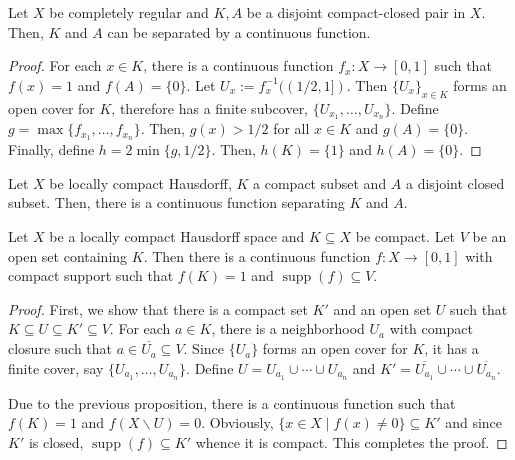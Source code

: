\begin{proposition}
    Let $X$ be completely regular and $K,A$ be a disjoint compact-closed pair in $X$. Then, $K$ and $A$ can be separated by a continuous function.
\end{proposition}
\begin{proof}
    For each $x\in K$, there is a continuous function $f_x: X\to[0,1]$ such that $f(x) = 1$ and $f(A) = \{0\}$. Let $U_x := f_x^{-1}((1/2,1])$. Then $\{U_x\}_{x\in K}$ forms an open cover for $K$, therefore has a finite subcover, $\{U_{x_1},\ldots,U_{x_n}\}$. Define $g = \max\{f_{x_1},\ldots,f_{x_n}\}$. Then, $g(x) > 1/2$ for all $x\in K$ and $g(A) = \{0\}$. Finally, define $h = 2\min\{g, 1/2\}$. Then, $h(K) = \{1\}$ and $h(A) = \{0\}$.
\end{proof}
\begin{corollary}
    Let $X$ be locally compact Hausdorff, $K$ a compact subset and $A$ a disjoint closed subset. Then, there is a continuous function separating $K$ and $A$.
\end{corollary}

\begin{theorem}
    Let $X$ be a locally compact Hausdorff space and $K\subseteq X$ be compact. Let $V$ be an open set containing $K$. Then there is a continuous function $f: X\to[0,1]$ with compact support such that $f(K) = 1$ and $\operatorname{supp}(f)\subseteq V$.
\end{theorem}
\begin{proof}
    First, we show that there is a compact set $K'$ and an open set $U$ such that $K\subseteq U\subseteq K'\subseteq V$. For each $a\in K$, there is a neighborhood $U_a$ with compact closure such that $a\in\overline{U_a}\subseteq V$. Since $\{U_a\}$ forms an open cover for $K$, it has a finite cover, say $\{U_{a_1},\ldots,U_{a_n}\}$. Define $U = U_{a_1}\cup\cdots\cup U_{a_n}$ and $K' = \overline{U_{a_1}}\cup\cdots\cup\overline{U_{a_n}}$. 

    Due to the previous proposition, there is a continuous function such that $f(K) = 1$ and $f(X\backslash U) = 0$. Obviously, $\{x\in X\mid f(x)\ne 0\}\subseteq K'$ and since $K'$ is closed, $\operatorname{supp}(f)\subseteq K'$ whence it is compact. This completes the proof.
\end{proof}

